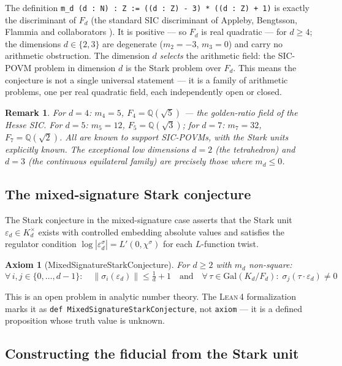 \documentclass[12pt,a4paper]{article}
\newtheorem{axiom_env}[theorem]{Axiom}
\newtheorem{remark}[theorem]{Remark}
\newcommand{\Lean}{\textsc{Lean\,4}}
\begin{document}
The definition \texttt{m\_d (d : N) : Z := ((d : Z) - 3) * ((d : Z) + 1)} is
exactly the discriminant of $F_d$ (the standard SIC discriminant of Appleby,
Bengtsson, Flammia and collaborators \cite{Appleby2013,Appleby2017}).  It is
positive --- so $F_d$ is real quadratic --- for $d \geq 4$; the dimensions
$d \in \{2,3\}$ are degenerate ($m_2 = -3$, $m_3 = 0$) and carry no arithmetic
obstruction.  The dimension $d$ \emph{selects} the
arithmetic field: the SIC-POVM problem in dimension $d$ is the Stark problem
over $F_d$.  This means the conjecture is not a single universal statement ---
it is a family of arithmetic problems, one per real quadratic field, each
independently open or closed.

\begin{remark}
For $d=4$: $m_4 = 5$, $F_4 = \mathbb{Q}(\sqrt{5})$ --- the golden-ratio field
of the Hesse SIC.  For $d=5$: $m_5 = 12$, $F_5 = \mathbb{Q}(\sqrt{3})$; for
$d=7$: $m_7 = 32$, $F_7 = \mathbb{Q}(\sqrt{2})$.  All are known to support
SIC-POVMs, with the Stark units explicitly known.  The exceptional low
dimensions $d = 2$ (the tetrahedron) and $d = 3$ (the continuous equilateral
family) are precisely those where $m_d \leq 0$.
\end{remark}

\subsection{The mixed-signature Stark conjecture}

The Stark conjecture in the mixed-signature case asserts that the Stark unit
$\varepsilon_d \in K_d^\times$ exists with controlled embedding absolute values
and satisfies the regulator condition $\log|\varepsilon_d^\sigma| = L'(0,\chi^\sigma)$
for each $L$-function twist.

\begin{axiom_env}[MixedSignatureStarkConjecture]
\label{ax:stark}
For $d \geq 2$ with $m_d$ non-square:
\[
\forall\, i,j \in \{0,\ldots,d-1\}:\quad
\|\sigma_i(\varepsilon_d)\| \leq \tfrac{1}{d} + 1
\quad\text{and}\quad
\forall\, \tau \in \mathrm{Gal}(K_d/F_d):\; \sigma_j(\tau\cdot\varepsilon_d) \neq 0
\]
\end{axiom_env}

This is an open problem in analytic number theory.  The \Lean{}
formalization marks it as \texttt{def MixedSignatureStarkConjecture}, not
\texttt{axiom} --- it is a defined proposition whose truth value is unknown.

\subsection{Constructing the fiducial from the Stark unit}
\end{document}
